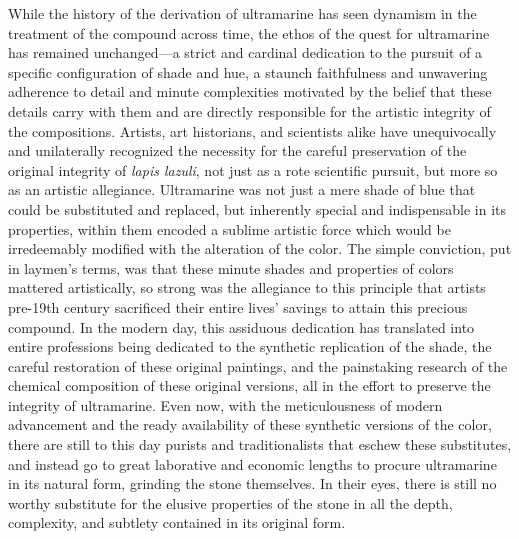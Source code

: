 While the history of the derivation of ultramarine has seen dynamism in
the treatment of the compound across time, the ethos of the quest for
ultramarine has remained unchanged---a strict and cardinal
dedication to the pursuit of a specific configuration of shade and hue,
a staunch faithfulness and unwavering adherence to detail and minute
complexities motivated by the belief that these details carry with them
and are directly responsible for the artistic integrity of the
compositions. Artists, art historians, and scientists alike have
unequivocally and unilaterally recognized the necessity for the careful
preservation of the original integrity of \emph{lapis lazuli}, not just
as a rote scientific pursuit, but more so as an artistic allegiance.
Ultramarine was not just a mere shade of blue that could be substituted
and replaced, but inherently special and indispensable in its
properties, within them encoded a sublime artistic force which would be
irredeemably modified with the alteration of the color. The simple
conviction, put in laymen's terms, was that these minute shades and
properties of colors mattered artistically, so strong was the allegiance
to this principle that artists pre-19th century sacrificed their entire
lives' savings to attain this precious compound. In the modern day, this
assiduous dedication has translated into entire professions being
dedicated to the synthetic replication of the shade, the careful
restoration of these original paintings, and the painstaking research of
the chemical composition of these original versions, all in the effort
to preserve the integrity of ultramarine. Even now, with the
meticulousness of modern advancement and the ready availability of these
synthetic versions of the color, there are still to this day purists and
traditionalists that eschew these substitutes, and instead go to great
laborative and economic lengths to procure ultramarine in its natural
form, grinding the stone themselves. In their eyes, there is still no
worthy substitute for the elusive properties of the stone in all the
depth, complexity, and subtlety contained in its original form.

